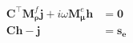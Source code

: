 \begin{equation}
    \begin{split}
        \mathbf{C}^\top \mathbf{M}_{\boldsymbol{\rho}}^f \mathbf{j} + i\omega\mathbf{M}_{\boldsymbol{\mu}}^e\mathbf{h} &= \mathbf{0} \\
        \mathbf{C} \mathbf{h} - \mathbf{j} &= \mathbf{s_e}
    \end{split}
    \label{eq:DiscreteFDEMHJ}
\end{equation}
